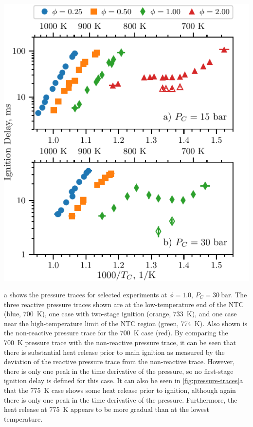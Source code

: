 \documentclass[letterpaper, review]{elsarticle}
\begin{document}
\begin{center}
    \captionsetup{type=figure}
    \includegraphics{figures/ignition-delays.pdf}
    \caption{Ignition delays of MV as a function of inverse temperature. Filled
    points are the overall ignition delays and hollow points are the first stage
    ignition delays. a) \SI{15}{\bar}. b) \SI{30}{\bar}}
    \label{fig:ignition-delays}
\end{center}

a shows the pressure traces for selected experiments at \(\phi=1.0\),
\(P_C =\SI[number-unit-product={\ }]{30}{\bar}\). The three reactive pressure traces shown are at
the low-temperature end of the NTC (blue, \SI{700}{\K}), one case with two-stage ignition (orange,
\SI{733}{\K}), and one case near the high-temperature limit of the NTC region (green, \SI{774}{\K}).
Also shown is the non-reactive pressure trace for the \SI{700}{\K} case (red). By comparing the
\SI{700}{\K} pressure trace with the non-reactive pressure trace, it can be seen that there is
substantial heat release prior to main ignition as measured by the deviation of the reactive
pressure trace from the non-reactive trace. However, there is only one peak in the time derivative
of the pressure, so no first-stage ignition delay is defined for this case. It can also be seen in
\cref{fig:pressure-traces}a that the \SI{775}{\K} case shows some heat release prior to ignition,
although again there is only one peak in the time derivative of the pressure. Furthermore, the heat
release at \SI{775}{\K} appears to be more gradual than at the lowest temperature.
\end{document}
